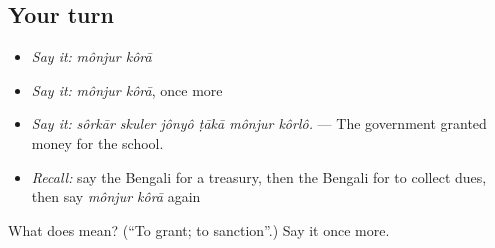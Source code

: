 \subsection*{Your turn}
\begin{itemize}
\raggedright
  \item \emph{Say it:} \emph{mônjur kôrā}
  \item \emph{Say it:} \emph{mônjur kôrā}, once more
  \item \emph{Say it:} \emph{sôrkār skuler jônyô ṭākā mônjur kôrlô.} — The government granted money for the school.
  \item \emph{Recall:} say the Bengali for a treasury, then the Bengali for to collect dues, then say \emph{mônjur kôrā} again
\end{itemize}

\begin{tcolorbox}[breakable,colback=teal!4,colframe=teal!35!black,title={Before you move on}]
What does   mean? (\textquotedblleft{}To grant; to sanction\textquotedblright{}.) Say it once more.
\end{tcolorbox}
